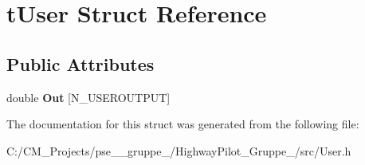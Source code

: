 \hypertarget{structt_user}{}\section{t\+User Struct Reference}
\label{structt_user}
\subsection*{Public Attributes}
\begin{DoxyCompactItemize}
\item 
\mbox{\label{structt_user_a8c379822623bca595f42c4d1dff876bb}} 
double {\bfseries Out} \mbox{[}N\+\_\+\+U\+S\+E\+R\+O\+U\+T\+P\+UT\mbox{]}
\end{DoxyCompactItemize}


The documentation for this struct was generated from the following file\+:\begin{DoxyCompactItemize}
\item 
C\+:/\+C\+M\+\_\+\+Projects/pse\+\_\+\_\+gruppe\+\_/\+Highway\+Pilot\+\_\+\+Gruppe\+\_/src/User.\+h\end{DoxyCompactItemize}

